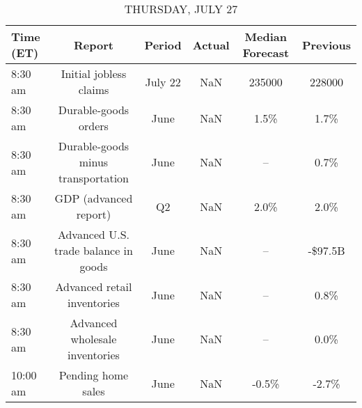 \documentclass{article}%
\begin{document}
%


\begin{table}[htbp]%
\caption{THURSDAY, JULY 27}%
\centering%
\begin{adjustbox}{width=1\textwidth}%
\begin{tabular}{lccccc}
\toprule
Time (ET) &                               Report &  Period & Actual & Median Forecast & Previous \\
\midrule
  8:30 am &               Initial jobless claims & July 22 &    NaN &          235000 &   228000 \\
  8:30 am &                 Durable-goods orders &    June &    NaN &            1.5\% &     1.7\% \\
  8:30 am &   Durable-goods minus transportation &    June &    NaN &              -- &     0.7\% \\
  8:30 am &                GDP (advanced report) &      Q2 &    NaN &            2.0\% &     2.0\% \\
  8:30 am & Advanced U.S. trade balance in goods &    June &    NaN &              -- &  -\$97.5B \\
  8:30 am &          Advanced retail inventories &    June &    NaN &              -- &     0.8\% \\
  8:30 am &       Advanced wholesale inventories &    June &    NaN &              -- &     0.0\% \\
 10:00 am &                   Pending home sales &    June &    NaN &           -0.5\% &    -2.7\% \\
\bottomrule
\end{tabular}
%
\end{adjustbox}%
\end{table}

%
\end{document}
